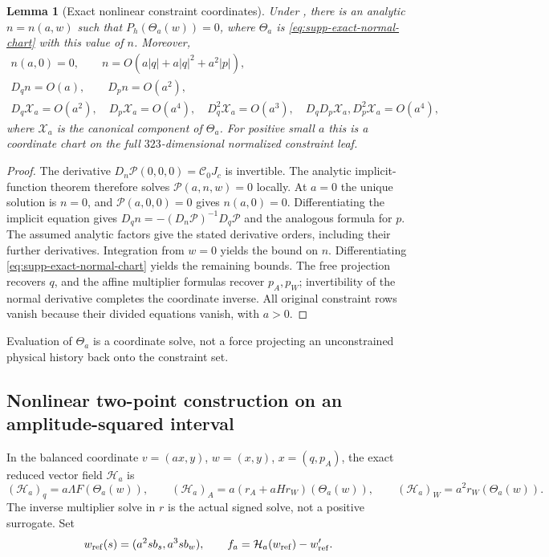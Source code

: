 \documentclass[11pt]{article}
\numberwithin{equation}{section}
\newtheorem{lemma}[lemma]{Lemma}
\theoremstyle{definition}
\theoremstyle{remark}
\begin{document}
\begin{lemma}[Exact nonlinear constraint coordinates]
\label{lem:supp-exact-normal-coordinates}
Under , there is an analytic
$n=n(a,w)$ such that $P_h(\Theta_a(w))=0$, where $\Theta_a$ is
\eqref{eq:supp-exact-normal-chart} with this value of $n$. Moreover,
\begin{equation}
 \begin{gathered}
 n(a,0)=0,\qquad n=O(a|q|+a|q|^2+a^2|p|),\\
 D_qn=O(a),\qquad D_pn=O(a^2),\\
 D_q\mathcal X_a=O(a^2),\quad D_p\mathcal X_a=O(a^4),\quad
 D_q^2\mathcal X_a=O(a^3),\quad
 D_qD_p\mathcal X_a,D_p^2\mathcal X_a=O(a^4),
 \end{gathered}
 \label{eq:supp-exact-normal-derivatives}
\end{equation}
where $\mathcal X_a$ is the canonical component of $\Theta_a$.
For positive small $a$ this is a coordinate chart on the full
$323$-dimensional normalized constraint leaf.
\end{lemma}
\begin{proof}
The derivative $D_n\mathcal P(0,0,0)=\mathcal C_0J_c$ is invertible.
The analytic implicit-function theorem therefore solves
$\mathcal P(a,n,w)=0$ locally. At $a=0$ the unique solution is $n=0$,
and $\mathcal P(a,0,0)=0$ gives $n(a,0)=0$. Differentiating the implicit
equation gives
$D_qn=-(D_n\mathcal P)^{-1}D_q\mathcal P$ and the analogous formula for
$p$. The assumed analytic factors give the stated derivative orders,
including their further derivatives. Integration from $w=0$ yields the
bound on $n$. Differentiating \eqref{eq:supp-exact-normal-chart} yields the
remaining bounds. The free projection recovers $q$, and the affine
multiplier formulas recover $p_A,p_W$; invertibility of the normal
derivative completes the coordinate inverse. All original constraint rows
vanish because their divided equations vanish, with $a>0$.
\end{proof}

Evaluation of $\Theta_a$ is a coordinate solve, not a force projecting an
unconstrained physical history back onto the constraint set.

\subsection{Nonlinear two-point construction on an amplitude-squared interval}
\label{subsec:supp-exact-boundary}

In the balanced coordinate $v=(ax,y)$, $w=(x,y)$, $x=(q,p_A)$, the exact
reduced vector field $\mathcal H_a$ is
\begin{equation}
 (\mathcal H_a)_q=a\Lambda F(\Theta_a(w)),\qquad
 (\mathcal H_a)_A=a(r_A+aHr_W)(\Theta_a(w)),\qquad
 (\mathcal H_a)_W=a^2r_W(\Theta_a(w)).
 \label{eq:supp-exact-reduced-field}
\end{equation}
The inverse multiplier solve in $r$ is the actual signed solve, not a
positive surrogate. Set
\begin{equation}
 w_{\rm ref}(s)=(a^2s b_s,a^3s b_w),\qquad
 f_a=\mathcal H_a(w_{\rm ref})-w_{\rm ref}'.
 \label{eq:supp-exact-reference}
\end{equation}
\end{document}
